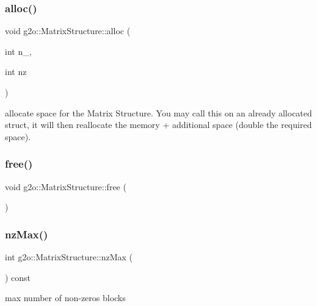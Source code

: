 \subsubsection{\texorpdfstring{alloc()}{alloc()}}
{\footnotesize\ttfamily void g2o\+::\+Matrix\+Structure\+::alloc (\begin{DoxyParamCaption}\item[{int}]{n\+\_\+,  }\item[{int}]{nz }\end{DoxyParamCaption})}

allocate space for the Matrix Structure. You may call this on an already allocated struct, it will then reallocate the memory + additional space (double the required space). \mbox{\label{classg2o_1_1_matrix_structure_a4bc9281fa8ae82dab908506fe0819498}} 
\subsubsection{\texorpdfstring{free()}{free()}}
{\footnotesize\ttfamily void g2o\+::\+Matrix\+Structure\+::free (\begin{DoxyParamCaption}{ }\end{DoxyParamCaption})}

\mbox{\label{classg2o_1_1_matrix_structure_ae44849701c44a9327ec5ff736d5eb54b}} 
\subsubsection{\texorpdfstring{nz\+Max()}{nzMax()}}
{\footnotesize\ttfamily int g2o\+::\+Matrix\+Structure\+::nz\+Max (\begin{DoxyParamCaption}{ }\end{DoxyParamCaption}) const\hspace{0.3cm}{\ttfamily [inline]}}



max number of non-\/zeros blocks 

\mbox{\label{classg2o_1_1_matrix_structure_a10f96bf6fbe278620b5507fb5b18cfdd}} 
